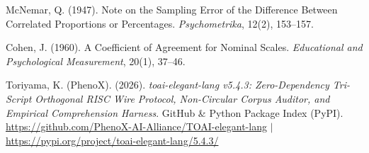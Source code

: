 \documentclass[9pt,a4paper]{extarticle}
\begin{document}
\begin{enumerate}[label={[\arabic*]},leftmargin=1.8em,itemsep=1pt,topsep=1.5pt]
  \item{\footnotesize McNemar, Q. (1947). Note on the Sampling Error of the Difference Between Correlated Proportions or Percentages. \emph{Psychometrika}, 12(2), 153--157.}
  \item{\footnotesize Cohen, J. (1960). A Coefficient of Agreement for Nominal Scales. \emph{Educational and Psychological Measurement}, 20(1), 37--46.}
  \item{\footnotesize Toriyama, K. (PhenoX). (2026). \emph{toai-elegant-lang v5.4.3: Zero-Dependency Tri-Script Orthogonal RISC Wire Protocol, Non-Circular Corpus Auditor, and Empirical Comprehension Harness}. GitHub \& Python Package Index (PyPI). \url{https://github.com/PhenoX-AI-Alliance/TOAI-elegant-lang} $|$ \url{https://pypi.org/project/toai-elegant-lang/5.4.3/}}
\end{enumerate}
\end{document}
